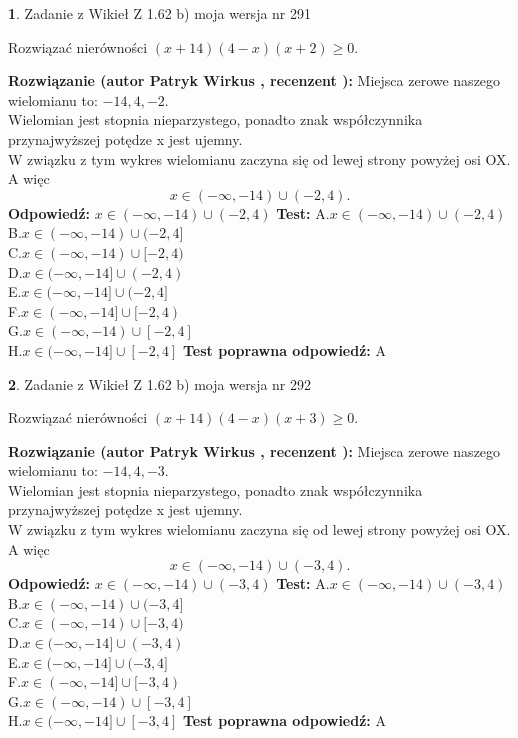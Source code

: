 \documentclass[12pt, a4paper]{article}
\theoremstyle{definition} %
\newtheorem{zad}{}
\newcommand{\zadStart}[1]{\begin{zad}#1\newline}
\newcommand{\zadStop}{\end{zad}}
\newcommand{\rozwStart}[2]{\noindent \textbf{Rozwiązanie (autor #1 , recenzent #2): }\newline}
\newcommand{\rozwStop}{\newline}
\newcommand{\odpStart}{\noindent \textbf{Odpowiedź:}\newline}
\newcommand{\odpStop}{\newline}
\newcommand{\testStart}{\noindent \textbf{Test:}\newline}
\newcommand{\testStop}{\newline}
\newcommand{\kluczStart}{\noindent \textbf{Test poprawna odpowiedź:}\newline}
\newcommand{\kluczStop}{\newline}
\begin{document}
\zadStart{Zadanie z Wikieł Z 1.62 b) moja wersja nr 291}

Rozwiązać nierówności $(x+14)(4-x)(x+2)\ge0$.
\zadStop
\rozwStart{Patryk Wirkus}{}
Miejsca zerowe naszego wielomianu to: $-14, 4, -2$.\\
Wielomian jest stopnia nieparzystego, ponadto znak współczynnika przy\linebreak najwyższej potędze x jest ujemny.\\ W związku z tym wykres wielomianu zaczyna się od lewej strony powyżej osi OX. A więc $$x \in (-\infty,-14) \cup (-2,4).$$
\rozwStop
\odpStart
$x \in (-\infty,-14) \cup (-2,4)$
\odpStop
\testStart
A.$x \in (-\infty,-14) \cup (-2,4)$\\
B.$x \in (-\infty,-14) \cup (-2,4]$\\
C.$x \in (-\infty,-14) \cup [-2,4)$\\
D.$x \in (-\infty,-14] \cup (-2,4)$\\
E.$x \in (-\infty,-14] \cup (-2,4]$\\
F.$x \in (-\infty,-14] \cup [-2,4)$\\
G.$x \in (-\infty,-14) \cup [-2,4]$\\
H.$x \in (-\infty,-14] \cup [-2,4]$
\testStop
\kluczStart
A
\kluczStop



\zadStart{Zadanie z Wikieł Z 1.62 b) moja wersja nr 292}

Rozwiązać nierówności $(x+14)(4-x)(x+3)\ge0$.
\zadStop
\rozwStart{Patryk Wirkus}{}
Miejsca zerowe naszego wielomianu to: $-14, 4, -3$.\\
Wielomian jest stopnia nieparzystego, ponadto znak współczynnika przy\linebreak najwyższej potędze x jest ujemny.\\ W związku z tym wykres wielomianu zaczyna się od lewej strony powyżej osi OX. A więc $$x \in (-\infty,-14) \cup (-3,4).$$
\rozwStop
\odpStart
$x \in (-\infty,-14) \cup (-3,4)$
\odpStop
\testStart
A.$x \in (-\infty,-14) \cup (-3,4)$\\
B.$x \in (-\infty,-14) \cup (-3,4]$\\
C.$x \in (-\infty,-14) \cup [-3,4)$\\
D.$x \in (-\infty,-14] \cup (-3,4)$\\
E.$x \in (-\infty,-14] \cup (-3,4]$\\
F.$x \in (-\infty,-14] \cup [-3,4)$\\
G.$x \in (-\infty,-14) \cup [-3,4]$\\
H.$x \in (-\infty,-14] \cup [-3,4]$
\testStop
\kluczStart
A
\kluczStop
\end{document}
